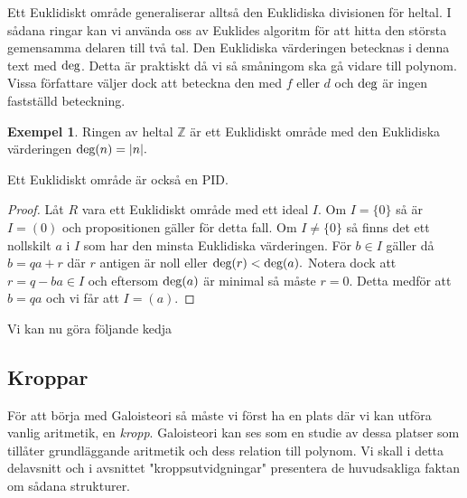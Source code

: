 \documentclass{article}
\newcommand{\grad}[0]{\textnormal{deg}}
\theoremstyle{definition}
\newtheorem{exmp}[thm]{Exempel}
\begin{document}
Ett Euklidiskt område generaliserar alltså den Euklidiska divisionen för heltal. I sådana ringar kan vi använda oss av Euklides algoritm för 
att hitta den största gemensamma delaren till två tal. Den Euklidiska värderingen betecknas i denna text med $\grad$. Detta är praktiskt 
då vi så småningom ska gå vidare till polynom. Vissa författare väljer dock att beteckna den med $f$ eller $d$ och $\grad$ är ingen fastställd beteckning.
\begin{exmp}
  Ringen av heltal $\mathbb{Z}$ är ett Euklidiskt område med den Euklidiska värderingen $\grad (n) = |n|.$
\end{exmp}

\begin{myprop}{}{}
  Ett Euklidiskt område är också en PID.
\end{myprop}
\begin{proof}
  Låt $R$ vara ett Euklidiskt område med ett ideal $I$. Om $I = \{0\}$ så är $I = (0)$ och propositionen gäller för detta fall. 
  Om $I \neq \{0\}$ så finns det ett nollskilt $a$ i $I$ som har den minsta Euklidiska värderingen. För $b \in I$ gäller då 
  $b = qa + r$ där $r$ antigen är noll eller $\grad (r)  < \grad (a).$ Notera dock att $r = q-ba \in I$ och eftersom $\grad (a)$ är minimal 
  så måste $r = 0$. Detta medför att $b = qa$ och vi får att $I = (a).$
\end{proof}
Vi kan nu göra följande kedja


\subsection{Kroppar}
För att börja med Galoisteori så måste vi först ha en plats där vi kan utföra vanlig aritmetik, en \textit{kropp}. Galoisteori kan ses som en studie 
av dessa platser som tillåter grundläggande aritmetik och dess relation till polynom. Vi skall i detta delavsnitt och i avsnittet "kroppsutvidgningar" 
presentera de huvudsakliga faktan om 
sådana strukturer. 
\end{document}
